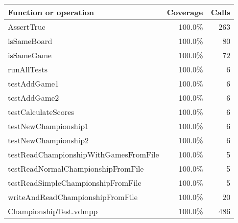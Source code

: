 \begin{longtable}{|l|r|r|}
\hline
Function or operation & Coverage & Calls \\
\hline
\hline
AssertTrue & 100.0\% & 263 \\
\hline
isSameBoard & 100.0\% & 80 \\
\hline
isSameGame & 100.0\% & 72 \\
\hline
runAllTests & 100.0\% & 6 \\
\hline
testAddGame1 & 100.0\% & 6 \\
\hline
testAddGame2 & 100.0\% & 6 \\
\hline
testCalculateScores & 100.0\% & 6 \\
\hline
testNewChampionship1 & 100.0\% & 6 \\
\hline
testNewChampionship2 & 100.0\% & 6 \\
\hline
testReadChampionshipWithGamesFromFile & 100.0\% & 5 \\
\hline
testReadNormalChampionshipFromFile & 100.0\% & 5 \\
\hline
testReadSimpleChampionshipFromFile & 100.0\% & 5 \\
\hline
writeAndReadChampionshipFromFile & 100.0\% & 20 \\
\hline
\hline
ChampionshipTest.vdmpp & 100.0\% & 486 \\
\hline
\end{longtable}

